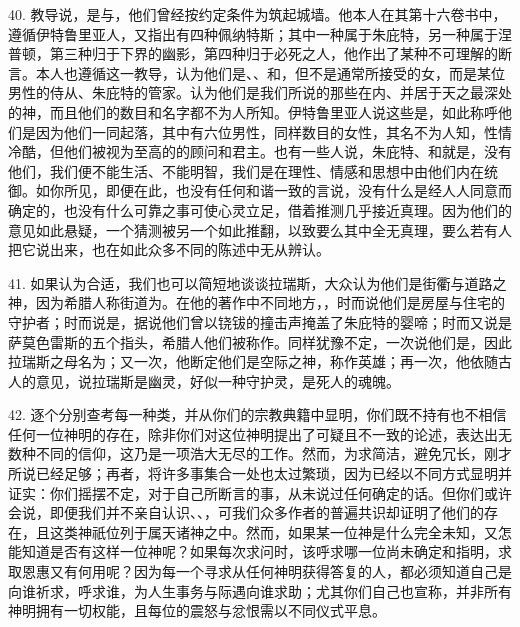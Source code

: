 40. 教导说，是与，他们曾经按约定条件为筑起城墙。他本人在其第十六卷书中，遵循伊特鲁里亚人，又指出有四种佩纳特斯；其中一种属于朱庇特，另一种属于涅普顿，第三种归于下界的幽影，第四种归于必死之人，他作出了某种不可理解的断言。本人也遵循这一教导，认为他们是、、和，但不是通常所接受的女，而是某位男性的侍从、朱庇特的管家。认为他们是我们所说的那些在内、并居于天之最深处的神，而且他们的数目和名字都不为人所知。伊特鲁里亚人说这些是，如此称呼他们是因为他们一同起落，其中有六位男性，同样数目的女性，其名不为人知，性情冷酷，但他们被视为至高的的顾问和君主。也有一些人说，朱庇特、和就是，没有他们，我们便不能生活、不能明智，我们是在理性、情感和思想中由他们内在统御。如你所见，即便在此，也没有任何和谐一致的言说，没有什么是经人人同意而确定的，也没有什么可靠之事可使心灵立足，借着推测几乎接近真理。因为他们的意见如此悬疑，一个猜测被另一个如此推翻，以致要么其中全无真理，要么若有人把它说出来，也在如此众多不同的陈述中无从辨认。\par

41. 如果认为合适，我们也可以简短地谈谈拉瑞斯，大众认为他们是街衢与道路之神，因为希腊人称街道为。在他的著作中不同地方，，时而说他们是房屋与住宅的守护者；时而说是，据说他们曾以铙钹的撞击声掩盖了朱庇特的婴啼；时而又说是萨莫色雷斯的五个指头，希腊人他们被称作。同样犹豫不定，一次说他们是，因此拉瑞斯之母名为；又一次，他断定他们是空际之神，称作英雄；再一次，他依随古人的意见，说拉瑞斯是幽灵，好似一种守护灵，是死人的魂魄。\par

42. 逐个分别查考每一种类，并从你们的宗教典籍中显明，你们既不持有也不相信任何一位神明的存在，除非你们对这位神明提出了可疑且不一致的论述，表达出无数种不同的信仰，这乃是一项浩大无尽的工作。然而，为求简洁，避免冗长，刚才所说已经足够；再者，将许多事集合一处也太过繁琐，因为已经以不同方式显明并证实：你们摇摆不定，对于自己所断言的事，从未说过任何确定的话。但你们或许会说，即便我们并不亲自认识、、，可我们众多作者的普遍共识却证明了他们的存在，且这类神祇位列于属天诸神之中。然而，如果某一位神是什么完全未知，又怎能知道是否有这样一位神呢？如果每次求问时，该呼求哪一位尚未确定和指明，求取恩惠又有何用呢？因为每一个寻求从任何神明获得答复的人，都必须知道自己是向谁祈求，呼求谁，为人生事务与际遇向谁求助；尤其你们自己也宣称，并非所有神明拥有一切权能，且每位的震怒与忿恨需以不同仪式平息。\par


